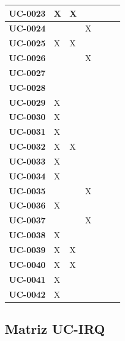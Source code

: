 \documentclass[11pt, a4paper]{article}
\begin{document}
\begin{center}
{\begin{longtable}{|p{2.2cm}|p{2.0cm}|p{2.0cm}|p{2.0cm}|p{2.0cm}|p{2.0cm}|p{2.0cm}|}
\hline
\textbf{UC-0023} & X & X &  &  &  &  \\
\hline
\textbf{UC-0024} &  &  & X &  &  &  \\
\hline
\textbf{UC-0025} & X & X &  &  &  &  \\
\hline
\textbf{UC-0026} &  &  & X &  &  &  \\
\hline
\textbf{UC-0027} &  &  &  &  &  &  \\
\hline
\textbf{UC-0028} &  &  &  &  &  &  \\
\hline
\textbf{UC-0029} & X &  &  &  &  &  \\
\hline
\textbf{UC-0030} & X &  &  &  &  &  \\
\hline
\textbf{UC-0031} & X &  &  &  &  &  \\
\hline
\textbf{UC-0032} & X & X &  &  &  &  \\
\hline
\textbf{UC-0033} & X &  &  &  &  &  \\
\hline
\textbf{UC-0034} & X &  &  &  &  &  \\
\hline
\textbf{UC-0035} &  &  & X &  &  &  \\
\hline
\textbf{UC-0036} & X &  &  &  &  &  \\
\hline
\textbf{UC-0037} &  &  & X &  &  &  \\
\hline
\textbf{UC-0038} & X &  &  &  &  &  \\
\hline
\textbf{UC-0039} & X & X &  &  &  &  \\
\hline
\textbf{UC-0040} & X & X &  &  &  &  \\
\hline
\textbf{UC-0041} & X &  &  &  &  &  \\
\hline
\textbf{UC-0042} & X &  &  &  &  &  \\
\hline

\end{longtable}
}
\end{center}


\subsection{Matriz UC-IRQ}
\end{document}
